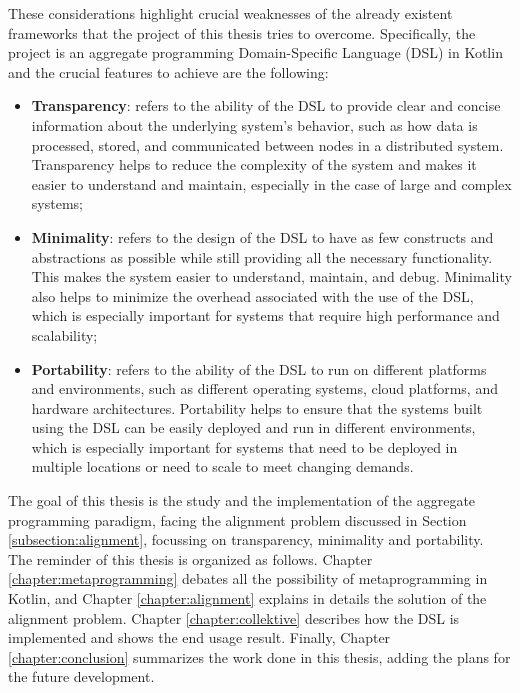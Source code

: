 These considerations highlight crucial weaknesses of the already existent frameworks that the project of this thesis tries to overcome. Specifically, the project is an aggregate programming Domain-Specific Language (DSL) in Kotlin and the crucial features to achieve are the following:
\begin{itemize}
    \item \textbf{Transparency}: refers to the ability of the DSL to provide clear and concise information about the underlying system's behavior, such as how data is processed, stored, and communicated between nodes in a distributed system. Transparency helps to reduce the complexity of the system and makes it easier to understand and maintain, especially in the case of large and complex systems;
    \item \textbf{Minimality}: refers to the design of the DSL to have as few constructs and abstractions as possible while still providing all the necessary functionality. This makes the system easier to understand, maintain, and debug. Minimality also helps to minimize the overhead associated with the use of the DSL, which is especially important for systems that require high performance and scalability;
    \item \textbf{Portability}: refers to the ability of the DSL to run on different platforms and environments, such as different operating systems, cloud platforms, and hardware architectures. Portability helps to ensure that the systems built using the DSL can be easily deployed and run in different environments, which is especially important for systems that need to be deployed in multiple locations or need to scale to meet changing demands.
\end{itemize}

The goal of this thesis is the study and the implementation of the aggregate programming paradigm, facing the alignment problem discussed in Section \ref{subsection:alignment}, focussing on transparency, minimality and portability.\newline
The reminder of this thesis is organized as follows. Chapter \ref{chapter:metaprogramming} debates all the possibility of metaprogramming in Kotlin, and Chapter \ref{chapter:alignment} explains in details the solution of the alignment problem. Chapter \ref{chapter:collektive} describes how the DSL is implemented and shows the end usage result. Finally, Chapter \ref{chapter:conclusion} summarizes the work done in this thesis, adding the plans for the future development.
